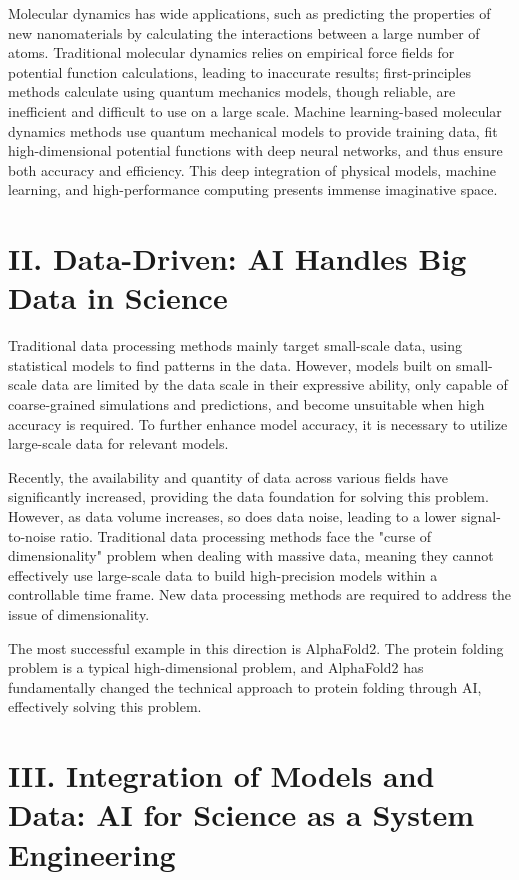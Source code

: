 Molecular dynamics has wide applications, such as predicting the properties of new nanomaterials by calculating the interactions between a large number of atoms. Traditional molecular dynamics relies on empirical force fields for potential function calculations, leading to inaccurate results; first-principles methods calculate using quantum mechanics models, though reliable, are inefficient and difficult to use on a large scale. Machine learning-based molecular dynamics methods use quantum mechanical models to provide training data, fit high-dimensional potential functions with deep neural networks, and thus ensure both accuracy and efficiency. This deep integration of physical models, machine learning, and high-performance computing presents immense imaginative space.

\section*{II. Data-Driven: AI Handles Big Data in Science}

Traditional data processing methods mainly target small-scale data, using statistical models to find patterns in the data. However, models built on small-scale data are limited by the data scale in their expressive ability, only capable of coarse-grained simulations and predictions, and become unsuitable when high accuracy is required. To further enhance model accuracy, it is necessary to utilize large-scale data for relevant models.

Recently, the availability and quantity of data across various fields have significantly increased, providing the data foundation for solving this problem. However, as data volume increases, so does data noise, leading to a lower signal-to-noise ratio. Traditional data processing methods face the "curse of dimensionality" problem when dealing with massive data, meaning they cannot effectively use large-scale data to build high-precision models within a controllable time frame. New data processing methods are required to address the issue of dimensionality.

The most successful example in this direction is AlphaFold2. The protein folding problem is a typical high-dimensional problem, and AlphaFold2 has fundamentally changed the technical approach to protein folding through AI, effectively solving this problem.

\section*{III. Integration of Models and Data: AI for Science as a System Engineering}

